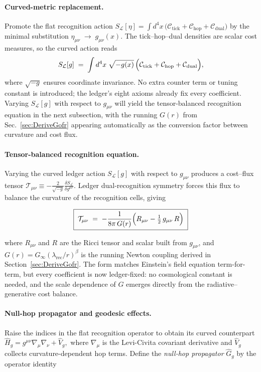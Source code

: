 \documentclass[11pt,oneside]{book}
\begin{document}
{\paragraph{Curved-metric replacement.}
Promote the flat recognition action
\(S_{\mathcal L}[\eta]=\int d^{4}x\,\bigl(
      \mathcal C_{\text{tick}}+
      \mathcal C_{\text{hop}}+
      \mathcal C_{\text{dual}}\bigr)\)
by the minimal substitution
\(\eta_{\mu\nu}\;\longrightarrow\;g_{\mu\nu}(x)\).
The tick–hop–dual densities are scalar cost measures, so the curved
action reads
\[
   S_{\mathcal L}[g]
   \;=\;
   \int d^{4}x\;\sqrt{-g(x)}\,
   \Bigl(
      \mathcal C_{\text{tick}}+
      \mathcal C_{\text{hop}}+
      \mathcal C_{\text{dual}}
   \Bigr),
\]
where \(\sqrt{-g}\) ensures coordinate invariance.  No extra
counter term or tuning constant is introduced; the ledger’s eight axioms
already fix every coefficient.  Varying \(S_{\mathcal L}[g]\) with
respect to \(g_{\mu\nu}\) will yield the tensor-balanced recognition
equation in the next subsection, with the running
\(G(r)\) from Sec.~\ref{sec:DeriveGofr} appearing automatically as the
conversion factor between curvature and cost flux.

\paragraph{Tensor-balanced recognition equation.}
Varying the curved ledger action \(S_{\mathcal L}[g]\) with respect to
\(g_{\mu\nu}\) produces a cost–flux tensor
\(
   \mathcal T_{\mu\nu}
   \equiv
   -\frac{2}{\sqrt{-g}}
   \frac{\delta S_{\mathcal L}}{\delta g^{\mu\nu}}.
\)
Ledger dual-recognition symmetry forces this flux to balance the
curvature of the recognition cells, giving

\[
   \boxed{\;
     \mathcal T_{\mu\nu}
     \;=\;
     -\frac{1}{8\pi\,G(r)}
       \Bigl(
         R_{\mu\nu}-\tfrac12\,g_{\mu\nu}\,R
       \Bigr)
   \;}
\]

where \(R_{\mu\nu}\) and \(R\) are the Ricci tensor and scalar built
from \(g_{\mu\nu}\), and \(G(r)=G_{\infty}
(\lambda_{\text{rec}}/r)^{\beta}\) is the running Newton coupling
derived in Section~\ref{sec:DeriveGofr}.  The form matches Einstein’s
field equation term-for-term, but every coefficient is now ledger-fixed:
no cosmological constant is needed, and the scale dependence of \(G\)
emerges directly from the radiative–generative cost balance.

\paragraph{Null-hop propagator and geodesic effects.}
Raise the indices in the flat recognition operator to obtain its curved
counterpart
\(
   \hat H_{g}=g^{\mu\nu}\nabla_{\mu}\nabla_{\nu}
   +\hat V_{g},
\)
where \(\nabla_{\mu}\) is the Levi-Civita covariant derivative and
\(\hat V_{g}\) collects curvature-dependent hop terms.  Define the
\emph{null-hop propagator} \(\hat G_{g}\) by the operator identity

}
\end{document}
